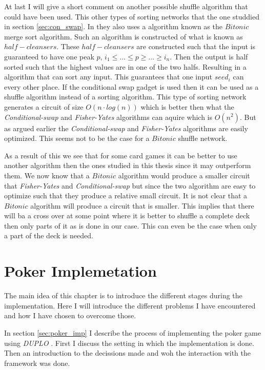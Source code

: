 \documentclass[twoside,11pt,openright]{report}
\newcommand{\FY}{\textit{Fisher-Yates} }
\newcommand{\CS}{\textit{Conditional-swap} }
\newcommand{\DUPLO}{\textit{DUPLO} }
\begin{document}
\bigskip

At last I will give a short comment on another possible shuffle algorithm that could have been used. This other types of sorting networks that the one studdied in section \ref{sec:con_swap}. In  they also uses a algorithm known as the $Bitonic$ merge sort algorithm. Such an algorithm is constructed of what is known as $half-cleansers$. These $half-cleansers$ are constructed such that the input is guaranteed to have one peak $p$, $i_1\leq \dots \leq p \geq \dots \geq i_n$. Then the output is half sorted such that the highest values are in one of the two halfs. Resulting in a algorithm that can sort any input. This guarantees that one input $seed_i$ can every other place. If the conditional swap gadget is used then it can be used as a shuffle algorithm instead of a sorting algorithm. This type of sorting network generates a circuit of size $O(n\cdot log(n))$ which is better then what the \CS and \FY algorithms can aquire which is $O(n^2)$. But as argued earlier the \CS and \FY algorithms are easily optimized. This seems not to be the case for a $Bitonic$ shuffle network.

As a result of this we see that for some card games it can be better to use another algorithm then the ones studied in this thesis since it may outperform them. We now know that a $Bitonic$ algorithm would produce a smaller circuit that \FY and \CS but since the two algorithm are easy to optimize such that they produce a relative small circuit. It is not clear that a $Bitonic$ algorithm will produce a circuit that is smaller. This implies that there will ba a cross over at some point where it is better to shuffle a complete deck then only parts of it as is done in our case. This can even be the case when only a part of the deck is needed.


\chapter{Poker Implemetation}
\label{ch:implementation}
The main idea of this chapter is to introduce the different stages during the implementation. Here I will introduce the different problems I have encountered and how I have chosen to overcome those.

In section \ref{sec:poker_imp} I describe the process of implementing the poker game using \DUPLO. First I discuss the setting in which the implementation is done. Then an introduction to the decissions made and woh the interaction with the framework was done.
\end{document}
